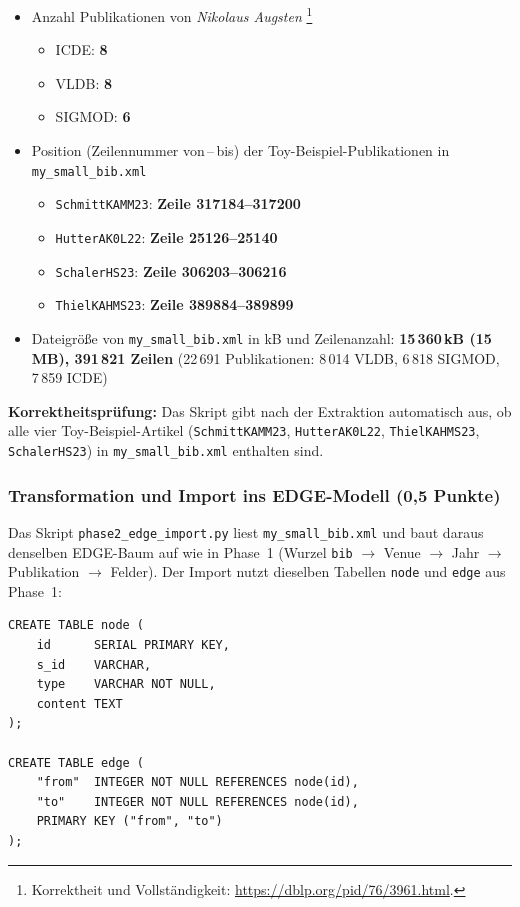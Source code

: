 \documentclass[11pt]{scrartcl}
\begin{document}
\begin{itemize}
  \item Anzahl Publikationen von \textit{Nikolaus Augsten}%
    \footnote{Korrektheit und Vollständigkeit: \url{https://dblp.org/pid/76/3961.html}.}
    \begin{itemize}
      \item ICDE:   \textbf{8}
      \item VLDB:   \textbf{8}
      \item SIGMOD: \textbf{6}
    \end{itemize}
  \item Position (Zeilennummer von\,--\,bis) der Toy-Beispiel-Publikationen in \texttt{my\_small\_bib.xml}
    \begin{itemize}
      \item \texttt{SchmittKAMM23}: \textbf{Zeile 317184--317200}
      \item \texttt{HutterAK0L22}:  \textbf{Zeile 25126--25140}
      \item \texttt{SchalerHS23}:   \textbf{Zeile 306203--306216}
      \item \texttt{ThielKAHMS23}:  \textbf{Zeile 389884--389899}
    \end{itemize}
  \item Dateigröße von \texttt{my\_small\_bib.xml} in kB und Zeilenanzahl:
        \textbf{15\,360\,kB (15\,MB), 391\,821 Zeilen} (22\,691 Publikationen: 8\,014 VLDB, 6\,818 SIGMOD, 7\,859 ICDE)
\end{itemize}

\textbf{Korrektheitsprüfung:} Das Skript gibt nach der Extraktion automatisch aus, ob alle vier
Toy-Beispiel-Artikel (\texttt{SchmittKAMM23}, \texttt{HutterAK0L22}, \texttt{ThielKAHMS23},
\texttt{SchalerHS23}) in \texttt{my\_small\_bib.xml} enthalten sind.

\subsubsection*{Transformation und Import ins EDGE-Modell (0,5 Punkte)}

Das Skript \texttt{phase2\_edge\_import.py} liest \texttt{my\_small\_bib.xml} und baut
daraus denselben EDGE-Baum auf wie in Phase~1 (Wurzel \texttt{bib} $\to$ Venue $\to$
Jahr $\to$ Publikation $\to$ Felder). Der Import nutzt dieselben Tabellen \texttt{node}
und \texttt{edge} aus Phase~1:

\begin{lstlisting}[style=dmrsql, frame=single]
CREATE TABLE node (
    id      SERIAL PRIMARY KEY,
    s_id    VARCHAR,
    type    VARCHAR NOT NULL,
    content TEXT
);

CREATE TABLE edge (
    "from"  INTEGER NOT NULL REFERENCES node(id),
    "to"    INTEGER NOT NULL REFERENCES node(id),
    PRIMARY KEY ("from", "to")
);
\end{lstlisting}
\end{document}
